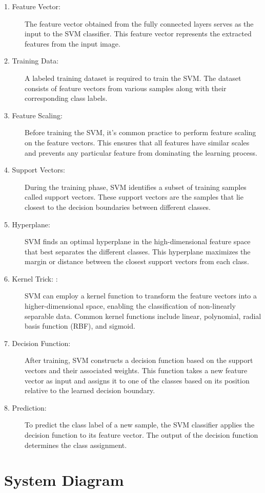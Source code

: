 \begin{description}
\begin{figure}[tbh]
\begin{center}
\end{center}
\end{figure}
\newpage
\begin{description}
\item[1. Feature Vector:]The feature vector obtained from the fully connected layers serves as the input to the SVM classifier. This feature vector represents the extracted features from the input image.
\item[2. Training Data:]A labeled training dataset is required to train the SVM. The dataset consists of feature vectors from various samples along with their corresponding class labels.
\item[3. Feature Scaling: ]Before training the SVM, it's common practice to perform feature scaling on the feature vectors. This ensures that all features have similar scales and prevents any particular feature from dominating the learning process.
\item[4. Support Vectors:]During the training phase, SVM identifies a subset of training samples called support vectors. These support vectors are the samples that lie closest to the decision boundaries between different classes.
\item[5. Hyperplane:]SVM finds an optimal hyperplane in the high-dimensional feature space that best separates the different classes. This hyperplane maximizes the margin or distance between the closest support vectors from each class.
\item[6. Kernel Trick: :]SVM can employ a kernel function to transform the feature vectors into a higher-dimensional space, enabling the classification of non-linearly separable data. Common kernel functions include linear, polynomial, radial basis function (RBF), and sigmoid.
\item[7. Decision Function:]After training, SVM constructs a decision function based on the support vectors and their associated weights. This function takes a new feature vector as input and assigns it to one of the classes based on its position relative to the learned decision boundary.
\item[8. Prediction:]To predict the class label of a new sample, the SVM classifier applies the decision function to its feature vector. The output of the decision function determines the class assignment.
\end{description}
\end{description} 
\newpage
\section{System Diagram}
\vspace{-18pt}
